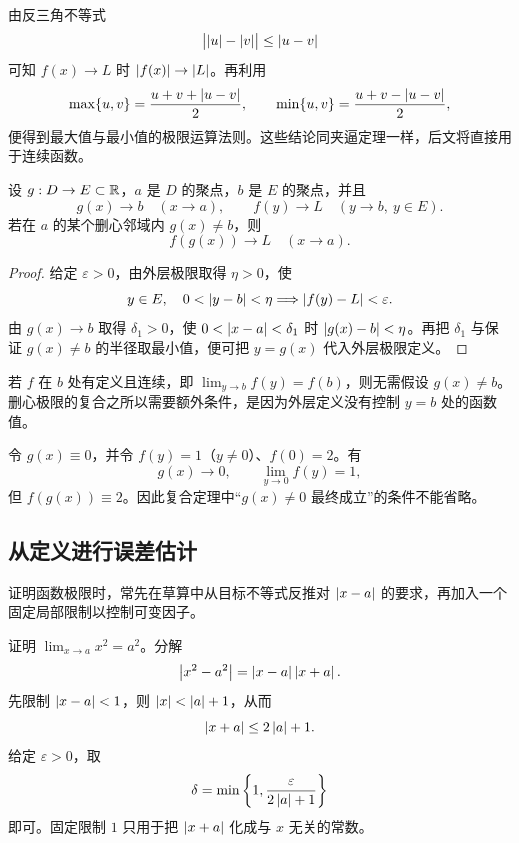 由反三角不等式
\[
 \bigl|\left|u\right|-\left|v\right|\bigr|\le\left|u-v\right|
\]
可知 \(f(x)\to L\) 时 \(\left|f(x)\right|\to\left|L\right|\)。再利用
\[
 \max\{u,v\}=\frac{u+v+\left|u-v\right|}2,
 \qquad
 \min\{u,v\}=\frac{u+v-\left|u-v\right|}2,
\]
便得到最大值与最小值的极限运算法则。这些结论同夹逼定理一样，后文将直接用于连续函数。

\begin{theorem}[复合极限]
设 \(g:D\to E\subset\mathbb{R}\)，\(a\) 是 \(D\) 的聚点，\(b\) 是 \(E\) 的聚点，并且
\[
 g(x)\to b\quad(x\to a),\qquad f(y)\to L\quad(y\to b,\ y\in E).
\]
若在 \(a\) 的某个删心邻域内 \(g(x)\ne b\)，则
\[
 f(g(x))\to L\quad(x\to a).
\]
\end{theorem}

\begin{proof}
给定 \(\varepsilon>0\)，由外层极限取得 \(\eta>0\)，使
\[
 y\in E,\quad0<\left|y-b\right|<\eta
 \Longrightarrow\left|f(y)-L\right|<\varepsilon.
\]
由 \(g(x)\to b\) 取得 \(\delta_1>0\)，使 \(0<\left|x-a\right|<\delta_1\) 时 \(\left|g(x)-b\right|<\eta\)。再把 \(\delta_1\) 与保证 \(g(x)\ne b\) 的半径取最小值，便可把 \(y=g(x)\) 代入外层极限定义。
\end{proof}

若 \(f\) 在 \(b\) 处有定义且连续，即 \(\lim_{y\to b}f(y)=f(b)\)，则无需假设 \(g(x)\ne b\)。删心极限的复合之所以需要额外条件，是因为外层定义没有控制 \(y=b\) 处的函数值。

\begin{counterexample}
令 \(g(x)\equiv0\)，并令 \(f(y)=1\)（\(y\ne0\)）、\(f(0)=2\)。有
\[
 g(x)\to0,\qquad \lim_{y\to0}f(y)=1,
\]
但 \(f(g(x))\equiv2\)。因此复合定理中“\(g(x)\ne0\) 最终成立”的条件不能省略。
\end{counterexample}

\subsection{从定义进行误差估计}

证明函数极限时，常先在草算中从目标不等式反推对 \(\left|x-a\right|\) 的要求，再加入一个固定局部限制以控制可变因子。

\begin{example}[平方函数]
证明 \(\lim_{x\to a}x^2=a^2\)。分解
\[
 \left|x^2-a^2\right|=\left|x-a\right|\left|x+a\right|.
\]
先限制 \(\left|x-a\right|<1\)，则 \(\left|x\right|<\left|a\right|+1\)，从而
\[
 \left|x+a\right|\le2\left|a\right|+1.
\]
给定 \(\varepsilon>0\)，取
\[
 \delta=\min\left\{1,\frac{\varepsilon}{2\left|a\right|+1}\right\}
\]
即可。固定限制 \(1\) 只用于把 \(\left|x+a\right|\) 化成与 \(x\) 无关的常数。
\end{example}

